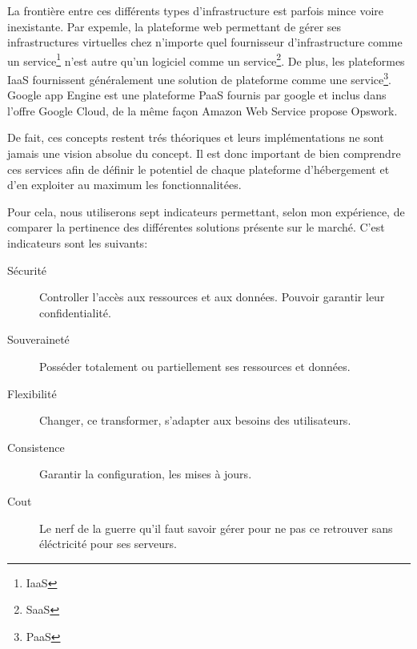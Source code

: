 \documentclass[11pt, a4paper ]{article}
\begin{document}
\begin{spacing}{1.5}
La frontière entre ces différents types d'infrastructure est parfois mince voire inexistante. Par expemle, la plateforme web permettant de gérer ses infrastructures virtuelles chez n'importe quel fournisseur d'infrastructure comme un service\footnote{IaaS} n'est autre qu'un logiciel comme un service\footnote{SaaS}. De plus, les plateformes IaaS fournissent généralement une solution de plateforme comme une service\footnote{PaaS}. Google app Engine est une plateforme PaaS fournis par google et inclus dans l'offre Google Cloud, de la même façon Amazon Web Service propose Opswork.

De fait, ces concepts restent trés théoriques et leurs implémentations ne sont jamais une vision absolue du concept. Il est donc important de bien comprendre ces services afin de définir le potentiel de chaque plateforme d'hébergement et d'en exploiter au maximum les fonctionnalitées.

Pour cela, nous utiliserons sept indicateurs permettant, selon mon expérience, de comparer la pertinence des différentes solutions présente sur le marché. C'est indicateurs sont les suivants:

\begin{description}

	\item[Sécurité]
		Controller l'accès aux ressources et aux données. Pouvoir garantir leur confidentialité.

	\item[Souveraineté]
		Posséder totalement ou partiellement ses ressources et données.

	\item[Flexibilité]
		Changer, ce transformer, s'adapter aux besoins des utilisateurs.

	\item[Consistence]
		Garantir la configuration, les mises à jours.

	\item[Cout]
		Le nerf de la guerre qu'il faut savoir gérer pour ne pas ce retrouver sans éléctricité pour ses serveurs.


\end{description}
\end{spacing}
\end{document}
